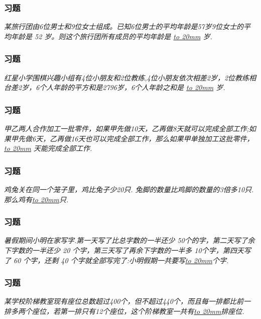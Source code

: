 \begin{frame}
    \frametitle{习题\theframecounter}
    \vspace*{-3cm}
    \textit{某旅行团由6位男士和9位女士组成。已知6位男士的平均年龄是57岁9位女士的平均年龄是 52 岁。则这个旅行团所有成员的平均年龄是 \underline{\hbox to 20mm{}} 岁.} 
\end{frame}

\begin{frame}
    \frametitle{习题\theframecounter}
    \vspace*{-3cm}
    \textit{红星小学围棋兴趣小组有4位小朋友和2位教练,4位小朋友依次相差2岁，2位教练相台差2岁，6个人年龄的平方和是2796岁，6个人年龄之和是 \underline{\hbox to 20mm{}} 岁.} 
\end{frame}

\begin{frame}
    \frametitle{习题\theframecounter}
    \vspace*{-3cm}
    \textit{甲乙两人合作加工一批零件，如果甲先做10天，乙再做8天就可以完成全部工作;如果甲先做6天，乙再做16天也可以完成全部工作，那么如果甲单独加工这批零件，\underline{\hbox to 20mm{}}
    天能完成全部工作.} 
\end{frame}

\begin{frame}
    \frametitle{习题\theframecounter}
    \vspace*{-3cm}
    \textit{鸡兔关在同一个笼子里，鸡比兔子少20只. 兔脚的数量比鸡脚的数量的3倍多10只.那么鸡有\underline{\hbox to 20mm{}}只.} 
\end{frame}

\begin{frame}
    \frametitle{习题\theframecounter}
    \vspace*{-3cm}
    \textit{暑假期间小明在家写字.第一天写了比总字数的一半还少 50个的字，第二天写了余下字数的一半还少 20 个字，第三天写了再余下字数的一半多 10个字，第四天写了 60 个字，还剩 40 个字就全部写完了:小明假期一共要写\underline{\hbox to 20mm{}}个字.} 
\end{frame}

\begin{frame}
    \frametitle{习题\theframecounter}
    \vspace*{-3cm}
    \textit{某学校阶梯教室现有座位总数超过400个，但不超过440个，而且每一排都比前一排多两个座位，若第一排只有12个座位，这个阶梯教室一共有\underline{\hbox to 20mm{}}排座位.} 
\end{frame}

